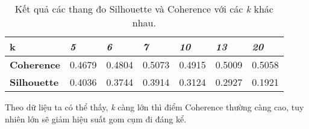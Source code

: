 \begin{table}[ht!]
    \centering
    \begin{tabular}{lllllll}
        \textbf{k}          & \textit{5} & \textit{6} & \textit{7} & \textit{10} & \textit{13} & \textit{20} \\ \hline
        \textbf{Coherence}  & 0.4679     & 0.4804     & 0.5073     & 0.4915      & 0.5009      & 0.5058      \\
        \textbf{Silhouette} & 0.4036     & 0.3744     & 0.3914     & 0.3124      & 0.2927      & 0.1921     
    \end{tabular}
    \caption{Kết quả các thang đo Silhouette và Coherence với các \textit{k}
    khác nhau.}
    \label{table:result}
\end{table}

Theo dữ liệu ta có thể thấy, \textit{k} càng lớn thì điểm Coherence thường càng
cao, tuy nhiên  lớn sẽ giảm hiệu suất gom cụm đi đáng kể.

